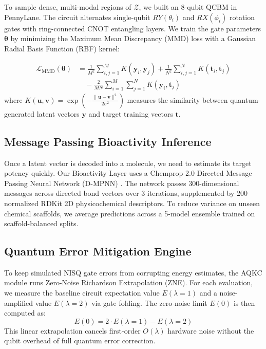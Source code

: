 \documentclass[journal,10pt,twocolumn]{IEEEtran}
\begin{document}
To sample dense, multi-modal regions of $\mathcal{Z}$, we built an 8-qubit QCBM in PennyLane. The circuit alternates single-qubit $RY(\theta_i)$ and $RX(\phi_i)$ rotation gates with ring-connected CNOT entangling layers. We train the gate parameters $\boldsymbol{\theta}$ by minimizing the Maximum Mean Discrepancy (MMD) loss with a Gaussian Radial Basis Function (RBF) kernel:

\begin{equation}
\begin{split}
\mathcal{L}_{\text{MMD}}(\boldsymbol{\theta}) &= \frac{1}{M^2}\sum_{i,j=1}^M K(\mathbf{y}_i, \mathbf{y}_j) + \frac{1}{N^2}\sum_{i,j=1}^N K(\mathbf{t}_i, \mathbf{t}_j) \\
&\quad - \frac{2}{MN}\sum_{i=1}^M \sum_{j=1}^N K(\mathbf{y}_i, \mathbf{t}_j)
\end{split}
\end{equation}
where $K(\mathbf{u}, \mathbf{v}) = \exp\left( -\frac{\|\mathbf{u} - \mathbf{v}\|^2}{2\sigma^2} \right)$ measures the similarity between quantum-generated latent vectors $\mathbf{y}$ and target training vectors $\mathbf{t}$.

\subsection{Message Passing Bioactivity Inference}
Once a latent vector is decoded into a molecule, we need to estimate its target potency quickly. Our Bioactivity Layer uses a Chemprop 2.0 Directed Message Passing Neural Network (D-MPNN) \cite{yang2019analyzing}. The network passes 300-dimensional messages across directed bond vectors over 3 iterations, supplemented by 200 normalized RDKit 2D physicochemical descriptors. To reduce variance on unseen chemical scaffolds, we average predictions across a 5-model ensemble trained on scaffold-balanced splits.

\subsection{Quantum Error Mitigation Engine}
To keep simulated NISQ gate errors from corrupting energy estimates, the AQKC module runs Zero-Noise Richardson Extrapolation (ZNE). For each evaluation, we measure the baseline circuit expectation value $E(\lambda=1)$ and a noise-amplified value $E(\lambda=2)$ via gate folding. The zero-noise limit $E(0)$ is then computed as:
\begin{equation}
E(0) = 2 \cdot E(\lambda=1) - E(\lambda=2)
\end{equation}
This linear extrapolation cancels first-order $O(\lambda)$ hardware noise without the qubit overhead of full quantum error correction.
\end{document}
